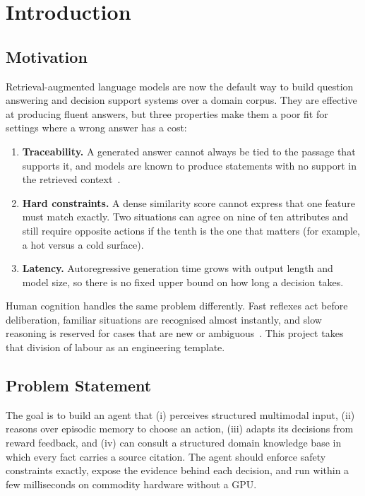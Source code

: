 \documentclass[12pt,a4paper,oneside]{report}
\begin{document}
\clearpage
{}

\chapter{Introduction}
\section{Motivation}
Retrieval-augmented language models are now the default way to build question answering and decision support systems over a domain corpus. They are effective at producing fluent answers, but three properties make them a poor fit for settings where a wrong answer has a cost:
\begin{enumerate}
  \item \textbf{Traceability.} A generated answer cannot always be tied to the passage that supports it, and models are known to produce statements with no support in the retrieved context~\cite{ji2023hallucination}.
  \item \textbf{Hard constraints.} A dense similarity score cannot express that one feature must match exactly. Two situations can agree on nine of ten attributes and still require opposite actions if the tenth is the one that matters (for example, a hot versus a cold surface).
  \item \textbf{Latency.} Autoregressive generation time grows with output length and model size, so there is no fixed upper bound on how long a decision takes.
\end{enumerate}
Human cognition handles the same problem differently. Fast reflexes act before deliberation, familiar situations are recognised almost instantly, and slow reasoning is reserved for cases that are new or ambiguous~\cite{kahneman2011}. This project takes that division of labour as an engineering template.

\section{Problem Statement}
The goal is to build an agent that (i) perceives structured multimodal input, (ii) reasons over episodic memory to choose an action, (iii) adapts its decisions from reward feedback, and (iv) can consult a structured domain knowledge base in which every fact carries a source citation. The agent should enforce safety constraints exactly, expose the evidence behind each decision, and run within a few milliseconds on commodity hardware without a GPU.
\end{document}

